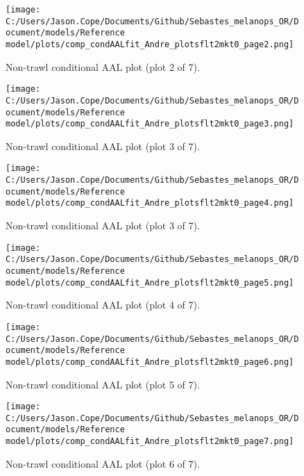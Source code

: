 \documentclass[11pt,
  english,
  letterpaper,
]{article}
\begin{document}
\begin{figure}
\centering
\texttt{[image: C:/Users/Jason.Cope/Documents/Github/Sebastes\_melanops\_OR/Document/models/Reference model/plots/comp\_condAALfit\_Andre\_plotsflt2mkt0\_page2.png]}
\caption{Non-trawl conditional AAL plot (plot 2 of 7).\label{fig:comp_condAALfit_Andre_plotsflt2mkt0_page2}}
\end{figure}

\begin{figure}
\centering
\texttt{[image: C:/Users/Jason.Cope/Documents/Github/Sebastes\_melanops\_OR/Document/models/Reference model/plots/comp\_condAALfit\_Andre\_plotsflt2mkt0\_page3.png]}
\caption{Non-trawl conditional AAL plot (plot 3 of 7).\label{fig:comp_condAALfit_Andre_plotsflt2mkt0_page3}}
\end{figure}

\begin{figure}
\centering
\texttt{[image: C:/Users/Jason.Cope/Documents/Github/Sebastes\_melanops\_OR/Document/models/Reference model/plots/comp\_condAALfit\_Andre\_plotsflt2mkt0\_page4.png]}
\caption{Non-trawl conditional AAL plot (plot 3 of 7).\label{fig:comp_condAALfit_Andre_plotsflt2mkt0_page4}}
\end{figure}

\begin{figure}
\centering
\texttt{[image: C:/Users/Jason.Cope/Documents/Github/Sebastes\_melanops\_OR/Document/models/Reference model/plots/comp\_condAALfit\_Andre\_plotsflt2mkt0\_page5.png]}
\caption{Non-trawl conditional AAL plot (plot 4 of 7).\label{fig:comp_condAALfit_Andre_plotsflt2mkt0_page5}}
\end{figure}

\begin{figure}
\centering
\texttt{[image: C:/Users/Jason.Cope/Documents/Github/Sebastes\_melanops\_OR/Document/models/Reference model/plots/comp\_condAALfit\_Andre\_plotsflt2mkt0\_page6.png]}
\caption{Non-trawl conditional AAL plot (plot 5 of 7).\label{fig:comp_condAALfit_Andre_plotsflt2mkt0_page6}}
\end{figure}

\begin{figure}
\centering
\texttt{[image: C:/Users/Jason.Cope/Documents/Github/Sebastes\_melanops\_OR/Document/models/Reference model/plots/comp\_condAALfit\_Andre\_plotsflt2mkt0\_page7.png]}
\caption{Non-trawl conditional AAL plot (plot 6 of 7).\label{fig:comp_condAALfit_Andre_plotsflt2mkt0_page7}}
\end{figure}
\end{document}
